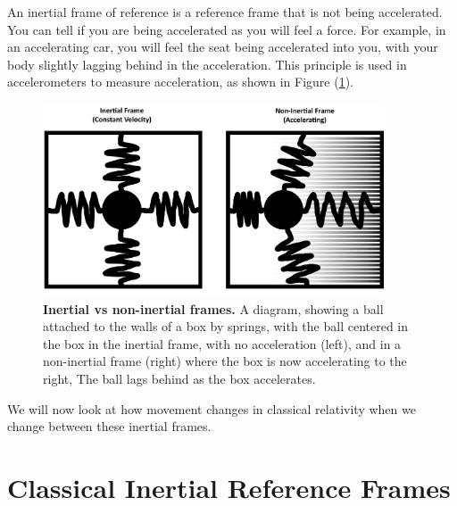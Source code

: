 An inertial frame of reference is a reference frame that is not being accelerated.
You can tell if you are being accelerated as you will feel a force.
For example, in an accelerating car, you will feel the seat being accelerated into you, with your body slightly lagging behind in the acceleration.
This principle is used in accelerometers to measure acceleration, as shown in Figure (\ref{fig: spring boxes}).

\begin{figure}[H]
	\centering
	\includegraphics[width = 0.9\textwidth]{images/pdf/Spring_boxes.pdf}
	\caption{\textbf{Inertial vs non-inertial frames.} A diagram, showing a ball attached to the walls of a box by springs, with the ball centered in the box in the inertial frame, with no acceleration (left), and in a non-inertial frame (right) where the box is now accelerating to the right, The ball lags behind as the box accelerates.}
	\label{fig: spring boxes}
\end{figure}

We will now look at how movement changes in classical relativity when we change between these inertial frames.


\section{Classical Inertial Reference Frames} \label{sect: Classical Inertial Reference Frames}

